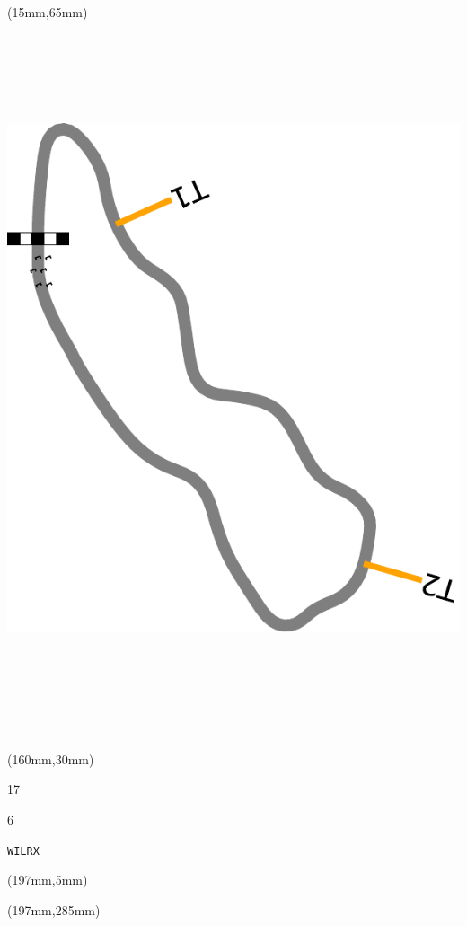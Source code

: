 \begin{textblock*}{185mm}(15mm,65mm)%
\centering
\mbox{\includegraphics[width=185mm,height=210mm,keepaspectratio]{PT/WILRX.pdf}}
\end{textblock*}
\begin{textblock*}{40mm}(160mm,30mm)%
\Large
\par{} 
\par17 
\par6 
\par\hfill\tiny\tt WILRX\\
\end{textblock*}
\begin{textblock*}{20mm}(197mm,5mm)%
\fbox{\thepage}
\label{WILRX}
\end{textblock*}
\begin{textblock*}{20mm}(197mm,285mm)%
\fbox{\thepage}
\end{textblock*}

